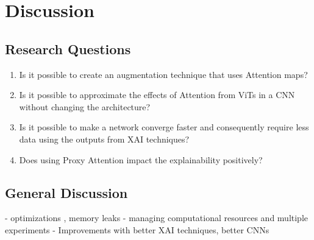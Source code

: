 \chapter{Discussion}
\section{Research Questions}
\begin{enumerate}
    \item Is it possible to create an augmentation technique that uses Attention maps?
    \item Is it possible to approximate the effects of Attention from ViTs in a CNN without changing the architecture?
    \item Is it possible to make a network converge faster and consequently require less data using the outputs from XAI techniques?
    \item Does using Proxy Attention impact the explainability positively?
\end{enumerate}

\section{General Discussion}
- optimizations , memory leaks
- managing computational resources and multiple experiments
- Improvements with better XAI techniques, better CNNs
